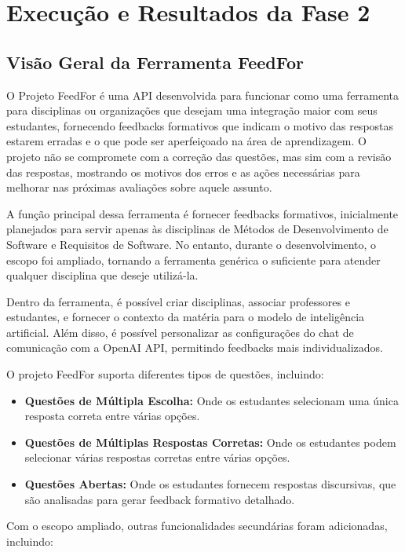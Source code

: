 \chapter{Execução e Resultados da Fase 2}

\section{Visão Geral da Ferramenta FeedFor}

O Projeto FeedFor é uma API desenvolvida para funcionar como uma ferramenta para disciplinas ou organizações que desejam uma integração maior com seus estudantes, fornecendo feedbacks formativos que indicam o motivo das respostas estarem erradas e o que pode ser aperfeiçoado na área de aprendizagem. O projeto não se compromete com a correção das questões, mas sim com a revisão das respostas, mostrando os motivos dos erros e as ações necessárias para melhorar nas próximas avaliações sobre aquele assunto.

A função principal dessa ferramenta é fornecer feedbacks formativos, inicialmente planejados para servir apenas às disciplinas de Métodos de Desenvolvimento de Software e Requisitos de Software. No entanto, durante o desenvolvimento, o escopo foi ampliado, tornando a ferramenta genérica o suficiente para atender qualquer disciplina que deseje utilizá-la.

Dentro da ferramenta, é possível criar disciplinas, associar professores e estudantes, e fornecer o contexto da matéria para o modelo de inteligência artificial. Além disso, é possível personalizar as configurações do chat de comunicação com a OpenAI API, permitindo feedbacks mais individualizados.

O projeto FeedFor suporta diferentes tipos de questões, incluindo:

\begin{itemize}
    \item \textbf{Questões de Múltipla Escolha:} Onde os estudantes selecionam uma única resposta correta entre várias opções.
    \item \textbf{Questões de Múltiplas Respostas Corretas:} Onde os estudantes podem selecionar várias respostas corretas entre várias opções.
    \item \textbf{Questões Abertas:} Onde os estudantes fornecem respostas discursivas, que são analisadas para gerar feedback formativo detalhado.
\end{itemize}

Com o escopo ampliado, outras funcionalidades secundárias foram adicionadas, incluindo:

